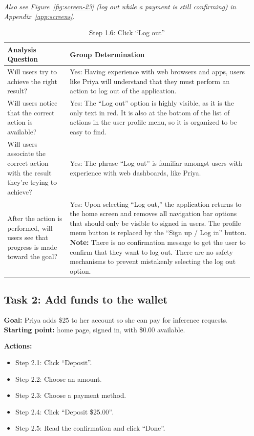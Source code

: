 \documentclass{article}
\begin{document}
\textit{Also see Figure~\ref{fig:screen-23} (log out while a payment is still confirming) in Appendix~\ref{app:screens}.}

\begin{table}[H]
    \centering
    \begin{tabularx}{\textwidth}{|p{5.5cm}|X|}
        \hline
        \textbf{Analysis Question} & \textbf{Group Determination} \\
        \hline
        Will users try to achieve the right result? & Yes: Having experience with web browsers and apps, users like Priya will understand that they must perform an action to log out of the application. \\
        \hline
        Will users notice that the correct action is available? & Yes: The ``Log out'' option is highly visible, as it is the only text in red. It is also at the bottom of the list of actions in the user profile menu, so it is organized to be easy to find. \\
        \hline
        Will users associate the correct action with the result they're trying to achieve? & Yes: The phrase ``Log out'' is familiar amongst users with experience with web dashboards, like Priya. \\
        \hline
        After the action is performed, will users see that progress is made toward the goal? & Yes: Upon selecting ``Log out,'' the application returns to the home screen and removes all navigation bar options that should only be visible to signed in users. The profile menu button is replaced by the ``Sign up / Log in'' button. \newline \textbf{Note:} There is no confirmation message to get the user to confirm that they want to log out. There are no safety mechanisms to prevent mistakenly selecting the log out option. \\
        \hline
    \end{tabularx}
    \caption{Step 1.6: Click ``Log out''}
    \label{tab:cw-step-1-6}
\end{table}

\subsection{Task 2: Add funds to the wallet}
\textbf{Goal:} Priya adds \$25 to her account so she can pay for inference requests.\\
\textbf{Starting point:} home page, signed in, with \$0.00 available.

\textbf{Actions:}
\begin{itemize}
    \item Step 2.1: Click ``Deposit''.
    \item Step 2.2: Choose an amount.
    \item Step 2.3: Choose a payment method.
    \item Step 2.4: Click ``Deposit \$25.00''.
    \item Step 2.5: Read the confirmation and click ``Done''.
\end{itemize}
\end{document}
